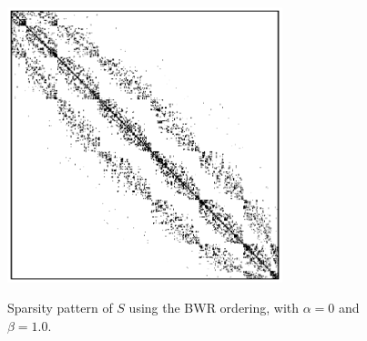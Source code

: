 \documentclass[preprint,showpacs,amssymb,aps]{revtex4}
\begin{document}
\begin{figure}
{\includegraphics[width=8cm]{anneal_s.eps}}
\caption{
Sparsity pattern of $S$ using the BWR ordering, with
$\alpha=0$ and $\beta = 1.0$.
}
\label{fig:anneal_s}
\end{figure} 
\end{document}
